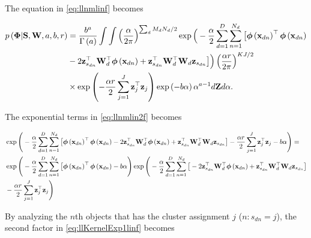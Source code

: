	The equation in \eqref{eq:llnmlinf} becomes
	
	\begin{align}
	p\left(\boldsymbol{\Phi}|\mathbf{S},\mathbf{W},a,b,r\right) &= \frac{b^a}{\Gamma\left(a\right)}\int \int \left(\frac{\alpha}{2\pi}\right)^{\sum_d M_d N_d /2}\exp\Big(-\frac{\alpha}{2} \sum_{d=1}^{D}\sum_{n=1}^{N_d}\big[ \boldsymbol{\phi}\left(\mathbf{x}_{dn}\right)^\top \boldsymbol{\phi}\left(\mathbf{x}_{dn}\right)  \notag\\
	&  - 2 \mathbf{z}_{s_{dn}} ^\top \mathbf{W}_d^\top \boldsymbol{\phi}\left(\mathbf{x}_{dn}\right) + \mathbf{z}_{s_{dn}}^\top \mathbf{W}_d^\top \mathbf{W}_d \mathbf{z}_{s_{dn}} \big]\Big)\left(\frac{\alpha r}{2\pi}\right)^{KJ/2} \notag \\
	&\times \exp\left(-\frac{\alpha r}{2} \sum_{j=1}^{J}\mathbf{z}_j^\top\mathbf{z}_j\right)\exp\left(-b\alpha\right)\alpha^{a-1}d\boldsymbol{\mathrm{Z}} d\alpha.
	\label{eq:llnmlin2f}
	\end{align}
	
	The exponential terms in \eqref{eq:llnmlin2f} becomes
	
	\begin{align}
	&\exp\Bigg(-\frac{\alpha}{2} \sum_{d=1}^{D}\sum_{n=1}^{N_d}\big[ \boldsymbol{\phi}\left(\mathbf{x}_{dn}\right)^\top \boldsymbol{\phi}\left(\mathbf{x}_{dn}\right)-2 \mathbf{z}_{s_{dn}} ^\top \mathbf{W}_d^\top \boldsymbol{\phi}\left(\mathbf{x}_{dn}\right) + \mathbf{z}_{s_{dn}}^\top \mathbf{W}_d^\top \mathbf{W}_d \mathbf{z}_{s_{dn}}\big]-\frac{\alpha r}{2} \sum_{j=1}^{J}\mathbf{z}_j^\top\mathbf{z}_j -b\alpha\Bigg) = \notag\\
	& \exp\Bigg(-\frac{\alpha}{2} \sum_{d=1}^{D}\sum_{n=1}^{N_d}\big[ \boldsymbol{\phi}\left(\mathbf{x}_{dn}\right)^\top \boldsymbol{\phi}\left(\mathbf{x}_{dn}\right)-b\alpha\Bigg)\exp\Bigg(-\frac{\alpha}{2} \sum_{d=1}^{D}\sum_{n=1}^{N_d}\big[ -2 \mathbf{z}_{s_{dn}} ^\top \mathbf{W}_d^\top \boldsymbol{\phi}\left(\mathbf{x}_{dn}\right)+\mathbf{z}_{s_{dn}}^\top \mathbf{W}_d^\top \mathbf{W}_d \mathbf{z}_{s_{dn}}\big] \notag\\
	&-\frac{\alpha r}{2} \sum_{j=1}^{J}\mathbf{z}_j^\top\mathbf{z}_j\Bigg) \label{eq:llKernelExp1linf}
	\end{align}
	
	By analyzing the $n$th objects that has the cluster assignment $j$ ($n:s_{dn}=j$), the second factor in \eqref{eq:llKernelExp1linf} becomes
	
